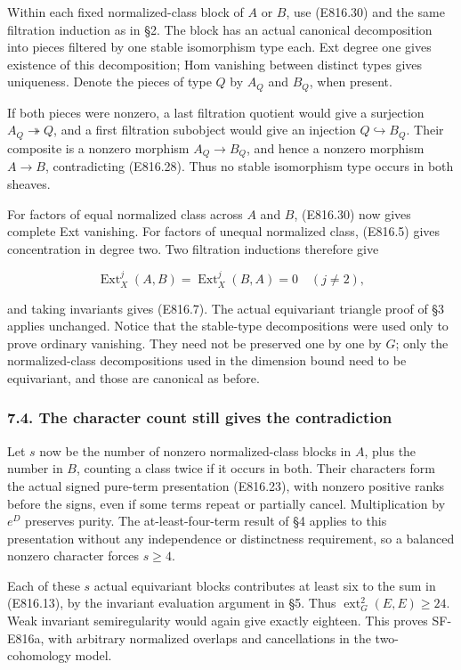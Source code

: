 Within each fixed normalized-class block of \(A\) or \(B\), use
(E816.30) and the same filtration induction as in §2. The block has an
actual canonical decomposition into pieces filtered by one stable
isomorphism type each. Ext degree one gives existence of this
decomposition; Hom vanishing between distinct types gives uniqueness.
Denote the pieces of type \(Q\) by \(A_Q\) and \(B_Q\), when present.

If both pieces were nonzero, a last filtration quotient would give a
surjection \(A_Q\twoheadrightarrow Q\), and a first filtration subobject
would give an injection \(Q\hookrightarrow B_Q\). Their composite is a
nonzero morphism \(A_Q\to B_Q\), and hence a nonzero morphism
\(A\to B\), contradicting (E816.28). Thus no stable isomorphism type
occurs in both sheaves.

For factors of equal normalized class across \(A\) and \(B\), (E816.30)
now gives complete Ext vanishing. For factors of unequal normalized
class, (E816.5) gives concentration in degree two. Two filtration
inductions therefore give

\[
 \operatorname{Ext}^j_X(A,B)
       =\operatorname{Ext}^j_X(B,A)=0\quad(j\ne2),
 \tag{E816.31}
\]

and taking invariants gives (E816.7). The actual equivariant triangle
proof of §3 applies unchanged. Notice that the stable-type
decompositions were used only to prove ordinary vanishing. They need not
be preserved one by one by \(G\); only the normalized-class
decompositions used in the dimension bound need to be equivariant, and
those are canonical as before.

\subsubsection{7.4. The character count still gives the
contradiction}\label{SF-E816-the-character-count-still-gives-the-contradiction}

Let \(s\) now be the number of nonzero normalized-class blocks in \(A\),
plus the number in \(B\), counting a class twice if it occurs in both.
Their characters form the actual signed pure-term presentation
(E816.23), with nonzero positive ranks before the signs, even if some
terms repeat or partially cancel. Multiplication by \(e^D\) preserves
purity. The at-least-four-term result of §4 applies to this presentation
without any independence or distinctness requirement, so a balanced
nonzero character forces \(s\ge4\).

Each of these \(s\) actual equivariant blocks contributes at least six
to the sum in (E816.13), by the invariant evaluation argument in §5.
Thus \(\operatorname{ext}^2_G(E,E)\ge24\). Weak invariant semiregularity
would again give exactly eighteen. This proves SF-E816a, with arbitrary
normalized overlaps and cancellations in the two-cohomology model.

